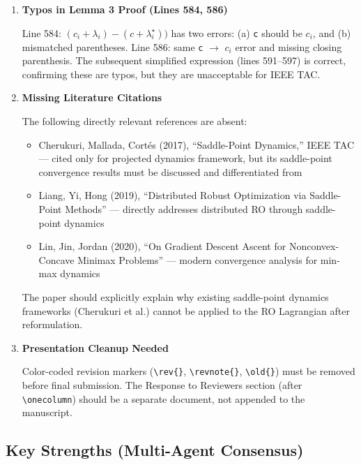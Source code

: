 \documentclass[journal,twoside,web]{ieeecolor}
\begin{document}
\begin{enumerate}[resume]

\item \textbf{Typos in Lemma 3 Proof (Lines 584, 586)}

Line 584: \texttt{$(c_i+\lambda_i)-(c+\lambda_i^\star))$} has two errors: (a) \texttt{c} should be \texttt{$c_i$}, and (b) mismatched parentheses. Line 586: same \texttt{c} $\to$ \texttt{$c_i$} error and missing closing parenthesis. The subsequent simplified expression (lines 591--597) is correct, confirming these are typos, but they are unacceptable for IEEE TAC.

\item \textbf{Missing Literature Citations}

The following directly relevant references are absent:
\begin{itemize}
\item Cherukuri, Mallada, Cort\'es (2017), ``Saddle-Point Dynamics,'' IEEE TAC --- cited only for projected dynamics framework, but its saddle-point convergence results must be discussed and differentiated from
\item Liang, Yi, Hong (2019), ``Distributed Robust Optimization via Saddle-Point Methods'' --- directly addresses distributed RO through saddle-point dynamics
\item Lin, Jin, Jordan (2020), ``On Gradient Descent Ascent for Nonconvex-Concave Minimax Problems'' --- modern convergence analysis for min-max dynamics
\end{itemize}

The paper should explicitly explain why existing saddle-point dynamics frameworks (Cherukuri et al.) cannot be applied to the RO Lagrangian after reformulation.

\item \textbf{Presentation Cleanup Needed}

Color-coded revision markers (\texttt{\textbackslash rev\{\}}, \texttt{\textbackslash revnote\{\}}, \texttt{\textbackslash old\{\}}) must be removed before final submission. The Response to Reviewers section (after \texttt{\textbackslash onecolumn}) should be a separate document, not appended to the manuscript.

\end{enumerate}

\subsection*{Key Strengths (Multi-Agent Consensus)}
\end{document}
